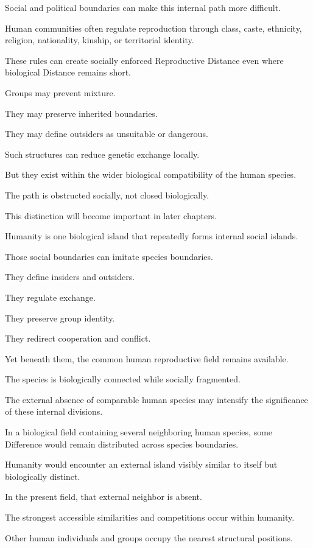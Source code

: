 Social and political boundaries can make this internal path more difficult.

Human communities often regulate reproduction through class, caste, ethnicity, religion, nationality, kinship, or territorial identity.

These rules can create socially enforced Reproductive Distance even where biological Distance remains short.

Groups may prevent mixture.

They may preserve inherited boundaries.

They may define outsiders as unsuitable or dangerous.

Such structures can reduce genetic exchange locally.

But they exist within the wider biological compatibility of the human species.

The path is obstructed socially, not closed biologically.

This distinction will become important in later chapters.

Humanity is one biological island that repeatedly forms internal social islands.

Those social boundaries can imitate species boundaries.

They define insiders and outsiders.

They regulate exchange.

They preserve group identity.

They redirect cooperation and conflict.

Yet beneath them, the common human reproductive field remains available.

The species is biologically connected while socially fragmented.

The external absence of comparable human species may intensify the significance of these internal divisions.

In a biological field containing several neighboring human species, some Difference would remain distributed across species boundaries.

Humanity would encounter an external island visibly similar to itself but biologically distinct.

In the present field, that external neighbor is absent.

The strongest accessible similarities and competitions occur within humanity.

Other human individuals and groups occupy the nearest structural positions.

